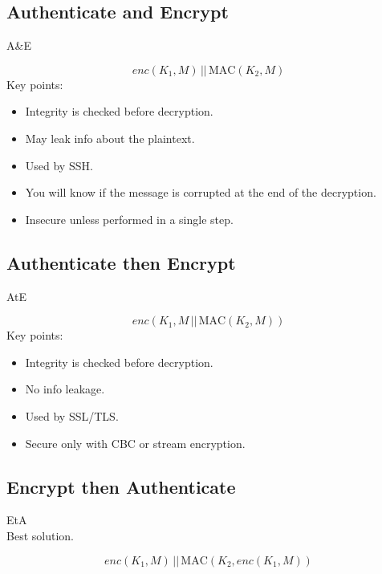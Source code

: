     \begin{multicols}{2}

        \subsection*{Authenticate and Encrypt}
    \begin{center}
        A\&E
    \end{center}
    \[
        enc(K_1, M) \, || \, \text{MAC}(K_2, M)
    \]
    Key points:
    \begin{itemize}
        \item Integrity is checked before decryption.
        \item May leak info about the plaintext.
        \item Used by SSH.
        \item You will know if the message is corrupted at the end of the decryption.
        \item Insecure unless performed in a single step.
    \end{itemize}
\columnbreak

    \subsection*{Authenticate then Encrypt}
    \begin{center}
        AtE
    \end{center}
    \[
        enc(K_1, M \, || \, \text{MAC}(K_2, M))
    \]
    Key points:
    \begin{itemize}
        \item Integrity is checked before decryption.
        \item No info leakage.
        \item Used by SSL/TLS.
        \item Secure only with CBC or stream encryption.
    \end{itemize}
\end{multicols}

\begin{center}
    \subsection*{Encrypt then Authenticate}
    \begin{center}
        EtA \\ Best solution.
    \end{center}
    \[
        enc(K_1, M) \, || \, \text{MAC}(K_2, enc(K_1, M))
    \]
\end{center}

